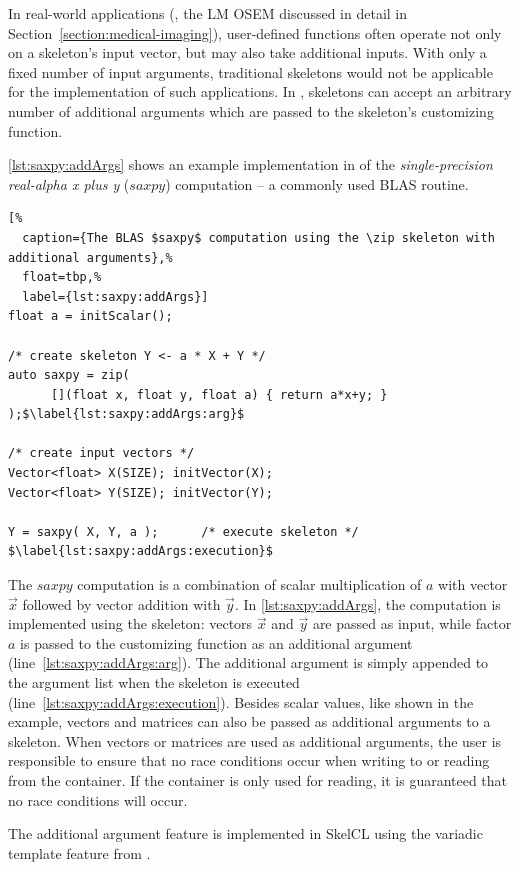 \bigskip
{}
In real-world applications (\eg, the LM OSEM discussed in detail in Section~\ref{section:medical-imaging}), user-defined functions often operate not only on a skeleton's input vector, but may also take additional inputs.
With only a fixed number of input arguments, traditional skeletons would not be applicable for the implementation of such applications.
In \SkelCL, skeletons can accept an arbitrary number of additional arguments which are passed to the skeleton's customizing function.

\autoref{lst:saxpy:addArgs} shows an example implementation in \SkelCL of the \emph{single-precision real-alpha x plus y} ($saxpy$) computation -- a commonly used BLAS routine.
\begin{lstlisting}[%
  caption={The BLAS $saxpy$ computation using the \zip skeleton with additional arguments},%
  float=tbp,%
  label={lst:saxpy:addArgs}]
float a = initScalar();

/* create skeleton Y <- a * X + Y */
auto saxpy = zip(
      [](float x, float y, float a) { return a*x+y; } );$\label{lst:saxpy:addArgs:arg}$

/* create input vectors */
Vector<float> X(SIZE); initVector(X);
Vector<float> Y(SIZE); initVector(Y);

Y = saxpy( X, Y, a );      /* execute skeleton */ $\label{lst:saxpy:addArgs:execution}$
\end{lstlisting}
The $saxpy$ computation is a combination of scalar multiplication of $a$ with vector $\vec{x}$ followed by vector addition with $\vec{y}$.
In \autoref{lst:saxpy:addArgs}, the computation is implemented using the \zip skeleton:
vectors $\vec{x}$ and $\vec{y}$ are passed as input, while factor $a$ is passed to the customizing function as an additional argument (line~\ref{lst:saxpy:addArgs:arg}).
The additional argument is simply appended to the argument list when the skeleton is executed (line~\ref{lst:saxpy:addArgs:execution}).
Besides scalar values, like shown in the example, vectors and matrices can also be passed as additional arguments to a skeleton.
When vectors or matrices are used as additional arguments, the user is responsible to ensure that no race conditions occur when writing to or reading from the container.
If the container is only used for reading, it is guaranteed that no race conditions will occur.

The additional argument feature is implemented in SkelCL using the variadic template feature from \Cpp.

